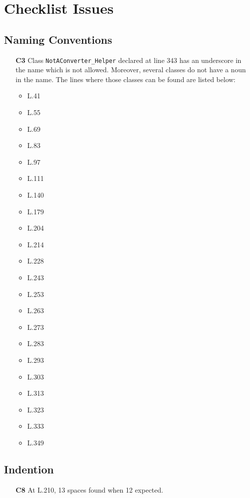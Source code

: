 \section{Checklist Issues}

\subsection{Naming Conventions}
	\begin{itemize}
		\item[\textbf{C3}] Class \texttt{NotAConverter\_Helper} declared at line 343 has an underscore in the name which is not allowed. Moreover, several classes do not have a noun in the name. The lines where those classes can be found are listed below:
		\begin{itemize}
			\item L.41
			\item L.55
			\item L.69
			\item L.83
			\item L.97
			\item L.111
			\item L.140
			\item L.179
			\item L.204
			\item L.214
			\item L.228
			\item L.243
			\item L.253
			\item L.263
			\item L.273
			\item L.283
			\item L.293
			\item L.303
			\item L.313
			\item L.323
			\item L.333
			\item L.349
		\end{itemize}
	\end{itemize}

\subsection{Indention}
	\begin{itemize}
		\item[\textbf{C8}] At L.210, 13 spaces found when 12 expected.
	\end{itemize}


